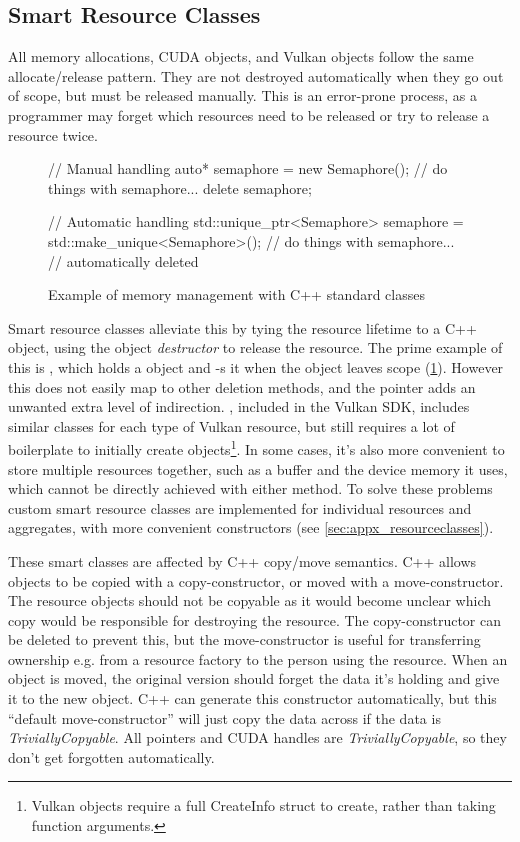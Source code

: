\subsection{Smart Resource Classes}
All memory allocations, CUDA objects, and Vulkan objects follow the same allocate/release pattern.
They are not destroyed automatically when they go out of scope, but must be released manually.
This is an error-prone process, as a programmer may forget which resources need to be released or try to release a resource twice.

\begin{figure}
    \centering
    \begin{cppcode}
// Manual handling
{
    auto* semaphore = new Semaphore();
    // do things with semaphore...
    delete semaphore;
}

// Automatic handling
{
    std::unique_ptr<Semaphore> semaphore = std::make_unique<Semaphore>();
    // do things with semaphore...
    // automatically deleted
}
    \end{cppcode}
    \caption{Example of memory management with C++ standard classes}
    \label{fig:ImplUniquePtr}
\end{figure}

Smart resource classes alleviate this by tying the resource lifetime to a C++ object, using the object \emph{destructor} to release the resource.
The prime example of this is , which holds a  object and -s it when the object leaves scope (\cref{fig:ImplUniquePtr}).
However this does not easily map to other deletion methods, and the pointer adds an unwanted extra level of indirection.
, included in the Vulkan SDK, includes similar classes for each type of Vulkan resource, but still requires a lot of boilerplate to initially create objects\footnote{Vulkan objects require a full CreateInfo struct to create, rather than taking function arguments.}.
In some cases, it's also more convenient to store multiple resources together, such as a buffer and the device memory it uses, which cannot be directly achieved with either method.
To solve these problems custom smart resource classes are implemented for individual resources and aggregates, with more convenient constructors (see \cref{sec:appx_resourceclasses}).

These smart classes are affected by C++ copy/move semantics.
C++ allows objects to be copied with a copy-constructor, or moved with a move-constructor.
The resource objects should not be copyable as it would become unclear which copy would be responsible for destroying the resource.
The copy-constructor can be deleted to prevent this, but the move-constructor is useful for transferring ownership e.g. from a resource factory to the person using the resource.
When an object is moved, the original version should forget the data it's holding and give it to the new object.
C++ can generate this constructor automatically, but this ``default move-constructor'' will just copy the data across if the data is \textit{TriviallyCopyable}\cite{cpprefMoveConstructor}.%
All pointers and CUDA handles are \textit{TriviallyCopyable}, so they don't get forgotten automatically.

